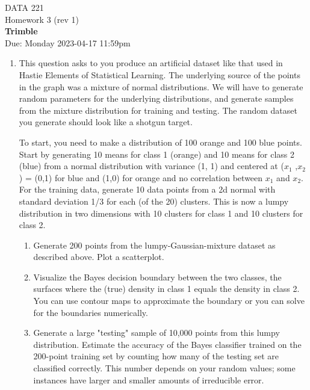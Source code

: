 \documentclass[12pt]{book}
\theoremstyle{definition}
\begin{document}
\begin{center}
{\Large DATA 221 \\  Homework 3  (rev 1)}\\
\textbf{Trimble}\\ %
Due: Monday 2023-04-17 11:59pm
\end{center}

\vspace{0.2 cm}
\begin{enumerate} 
\item 
This question asks to you produce an artificial dataset like that used in Hastie Elements of Statistical Learning.  The underlying source of the points in the graph was a mixture of normal distributions.  We will have to generate random parameters for the underlying distributions, and generate samples from the mixture distribution for training and testing.  The random dataset you generate should look like a shotgun target.

To start, you need to make a distribution of 100 orange and 100 blue points.  Start by generating  10 means for class 1 (orange) and 10 means for class 2 (blue) from a normal distribution with variance (1, 1) and centered at ($x_1$ ,$x_2$) = (0,1) for blue and (1,0) for orange and no correlation between $x_1$ and $x_2$.   
For the training data, generate 10 data points from a 2d normal with standard deviation 1/3 for each (of the 20) clusters.  This is now a lumpy distribution in two dimensions with 10 clusters for class 1 and 10 clusters for class 2.


\begin{enumerate}
\item 
Generate 200 points from the lumpy-Gaussian-mixture dataset as described above.  Plot a scatterplot.

\item
Visualize the Bayes decision boundary between the two classes, the surfaces where the (true) density in class 1 equals the density in class 2.  You can use contour maps to approximate the boundary or you can solve for the boundaries numerically.

\item
Generate a large "testing" sample of 10,000 points from this lumpy distribution.
Estimate the accuracy of the Bayes classifier trained on the 200-point training set by counting how many of the testing set are classified correctly.  This number depends on your random values; some instances have larger and smaller amounts of irreducible error.


\end{enumerate}
\end{enumerate}
\end{document}
